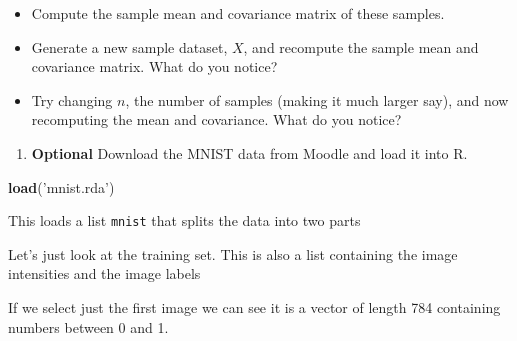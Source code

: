 \documentclass[]{book}
\newenvironment{Shaded}{\begin{snugshade}}{\end{snugshade}}
\newcommand{\CommentTok}[1]{\textcolor[rgb]{0.56,0.35,0.01}{\textit{#1}}}
\newcommand{\KeywordTok}[1]{\textcolor[rgb]{0.13,0.29,0.53}{\textbf{#1}}}
\newcommand{\NormalTok}[1]{#1}
\newcommand{\OperatorTok}[1]{\textcolor[rgb]{0.81,0.36,0.00}{\textbf{#1}}}
\newcommand{\StringTok}[1]{\textcolor[rgb]{0.31,0.60,0.02}{#1}}
\providecommand{\tightlist}{%
  \setlength{\itemsep}{0pt}\setlength{\parskip}{0pt}}
\theoremstyle{definition}
\theoremstyle{definition}
\theoremstyle{definition}
\theoremstyle{remark}
\begin{document}
\begin{itemize}
\tightlist
\item
  Compute the sample mean and covariance matrix of these samples.
\item
  Generate a new sample dataset, \(X\), and recompute the sample mean and covariance matrix. What do you notice?
\item
  Try changing \(n\), the number of samples (making it much larger say), and now recomputing the mean and covariance. What do you notice?
\end{itemize}

\begin{enumerate}
\def\labelenumi{\arabic{enumi}.}
\setcounter{enumi}{4}
\tightlist
\item
  \textbf{Optional} Download the MNIST data from Moodle and load it into R.
\end{enumerate}

\begin{Shaded}
\begin{Highlighting}[]
\KeywordTok{load}\NormalTok{(}\StringTok{'mnist.rda'}\NormalTok{)}
\end{Highlighting}
\end{Shaded}

This loads a list \texttt{mnist} that splits the data into two parts

\begin{Shaded}
\end{Shaded}

Let's just look at the training set. This is also a list containing the image intensities and the image labels

\begin{Shaded}
\end{Shaded}

If we select just the first image we can see it is a vector of length 784 containing numbers between 0 and 1.
\end{document}
